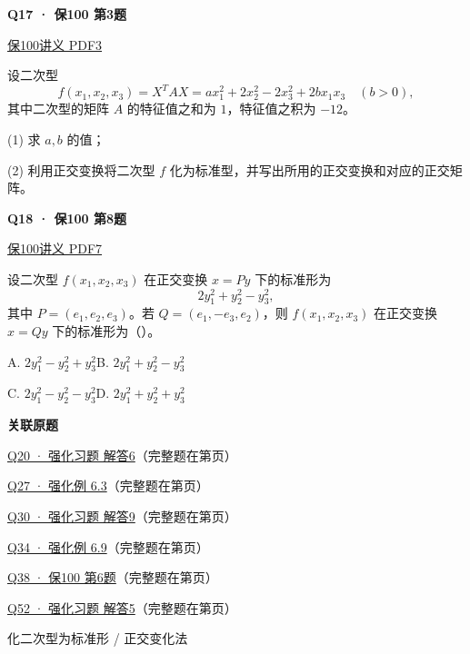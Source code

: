 \documentclass[UTF8,fontset=fandol,11pt,a4paper]{ctexart}
\newcommand{\source}[1]{{\footnotesize\color{Muted}#1\par}}
\newcommand{\qtitle}[2]{\par\needspace{5\baselineskip}\hypertarget{#1}{}\label{#1}\textbf{#2}\par}
\begin{document}
\begin{minipage}{\linewidth}
\qtitle{S-03}{Q17 · 保100 第3题}
\source{\href{file:///Users/skyintelligence/Desktop/\%E5\%BE\%97\%E8\%AF\%BB\%E4\%B8\%AA\%E7\%A0\%94-\%E5\%8C\%97\%E5\%A4\%A7\%E8\%BD\%AF\%E5\%BE\%AE/\%E6\%95\%B0\%E5\%AD\%A6\%20150/02\_\%E4\%B8\%93\%E9\%A1\%B9\%E5\%88\%B7\%E9\%A2\%98\_\%E4\%BF\%9D100/\%E7\%BA\%BF\%E6\%80\%A7\%E4\%BB\%A3\%E6\%95\%B0/\%E7\%BA\%BF\%E6\%80\%A7\%E4\%BB\%A3\%E6\%95\%B0\%E4\%B8\%93\%E9\%A1\%B9\%E5\%88\%B7\%E9\%A2\%98\%E8\%AF\%BE14-\%E4\%BA\%8C\%E6\%AC\%A1\%E5\%9E\%8B\%20\%E8\%AE\%B2\%E4\%B9\%89.pdf\#page=3}{保100讲义 PDF3}}
设二次型\[f(x_1,x_2,x_3)=X^TAX=ax_1^2+2x_2^2-2x_3^2+2bx_1x_3\quad(b>0),\]其中二次型的矩阵 \(A\) 的特征值之和为 \(1\)，特征值之积为 \(-12\)。\par (1) 求 \(a,b\) 的值；\par (2) 利用正交变换将二次型 \(f\) 化为标准型，并写出所用的正交变换和对应的正交矩阵。
\end{minipage}\par\vspace{7mm}
\begin{minipage}{\linewidth}
\qtitle{S-08}{Q18 · 保100 第8题}
\source{\href{file:///Users/skyintelligence/Desktop/\%E5\%BE\%97\%E8\%AF\%BB\%E4\%B8\%AA\%E7\%A0\%94-\%E5\%8C\%97\%E5\%A4\%A7\%E8\%BD\%AF\%E5\%BE\%AE/\%E6\%95\%B0\%E5\%AD\%A6\%20150/02\_\%E4\%B8\%93\%E9\%A1\%B9\%E5\%88\%B7\%E9\%A2\%98\_\%E4\%BF\%9D100/\%E7\%BA\%BF\%E6\%80\%A7\%E4\%BB\%A3\%E6\%95\%B0/\%E7\%BA\%BF\%E6\%80\%A7\%E4\%BB\%A3\%E6\%95\%B0\%E4\%B8\%93\%E9\%A1\%B9\%E5\%88\%B7\%E9\%A2\%98\%E8\%AF\%BE14-\%E4\%BA\%8C\%E6\%AC\%A1\%E5\%9E\%8B\%20\%E8\%AE\%B2\%E4\%B9\%89.pdf\#page=7}{保100讲义 PDF7}}
设二次型 \(f(x_1,x_2,x_3)\) 在正交变换 \(x=Py\) 下的标准形为\[2y_1^2+y_2^2-y_3^2,\]其中 \(P=(e_1,e_2,e_3)\)。若 \(Q=(e_1,-e_3,e_2)\)，则 \(f(x_1,x_2,x_3)\) 在正交变换 \(x=Qy\) 下的标准形为（\hspace{1em}）。\par A. \(2y_1^2-y_2^2+y_3^2\)\qquad B. \(2y_1^2+y_2^2-y_3^2\)\par C. \(2y_1^2-y_2^2-y_3^2\)\qquad D. \(2y_1^2+y_2^2+y_3^2\)
\end{minipage}\par\vspace{7mm}
\textbf{关联原题}\par
\hyperlink{R-LONG-06}{Q20 · 强化习题 解答6}（完整题在第\pageref*{R-LONG-06}页）\par
\hyperlink{R-EX-03}{Q27 · 强化例 6.3}（完整题在第\pageref*{R-EX-03}页）\par
\hyperlink{R-LONG-09}{Q30 · 强化习题 解答9}（完整题在第\pageref*{R-LONG-09}页）\par
\hyperlink{R-EX-09}{Q34 · 强化例 6.9}（完整题在第\pageref*{R-EX-09}页）\par
\hyperlink{S-06}{Q38 · 保100 第6题}（完整题在第\pageref*{S-06}页）\par
\hyperlink{R-LONG-05}{Q52 · 强化习题 解答5}（完整题在第\pageref*{R-LONG-05}页）\par
\clearpage
\source{化二次型为标准形 / 正交变化法}
\end{document}

